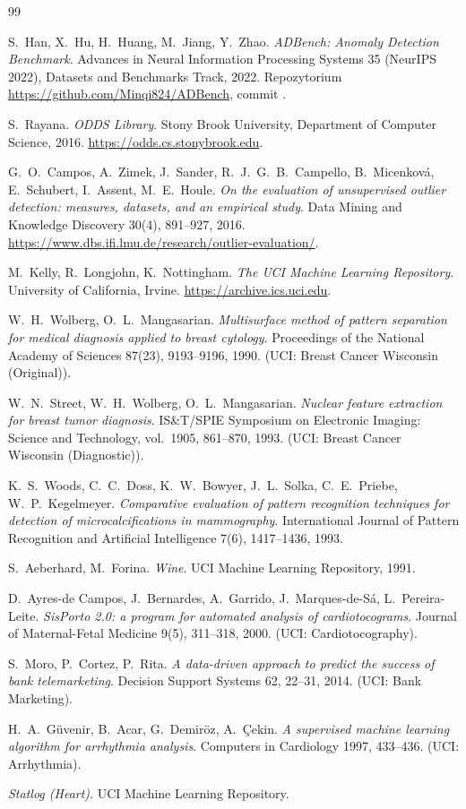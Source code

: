 \begin{thebibliography}{99}
\small

 S.~Han, X.~Hu, H.~Huang, M.~Jiang, Y.~Zhao.
\emph{ADBench: Anomaly Detection Benchmark}. Advances in Neural Information
Processing Systems 35 (NeurIPS 2022), Datasets and Benchmarks Track, 2022.
Repozytorium \url{https://github.com/Minqi824/ADBench},
commit .

 S.~Rayana. \emph{ODDS Library}. Stony Brook University,
Department of Computer Science, 2016. \url{https://odds.cs.stonybrook.edu}.

 G.~O.~Campos, A.~Zimek, J.~Sander, R.~J.~G.~B.~Campello,
B.~Micenková, E.~Schubert, I.~Assent, M.~E.~Houle. \emph{On the evaluation of
unsupervised outlier detection: measures, datasets, and an empirical study}.
Data Mining and Knowledge Discovery 30(4), 891--927, 2016.
\url{https://www.dbs.ifi.lmu.de/research/outlier-evaluation/}.

 M.~Kelly, R.~Longjohn, K.~Nottingham. \emph{The UCI Machine
Learning Repository}. University of California, Irvine.
\url{https://archive.ics.uci.edu}.

 W.~H.~Wolberg, O.~L.~Mangasarian. \emph{Multisurface method
of pattern separation for medical diagnosis applied to breast cytology}.
Proceedings of the National Academy of Sciences 87(23), 9193--9196, 1990.
(UCI: Breast Cancer Wisconsin (Original)).

 W.~N.~Street, W.~H.~Wolberg, O.~L.~Mangasarian. \emph{Nuclear
feature extraction for breast tumor diagnosis}. IS\&T/SPIE Symposium on
Electronic Imaging: Science and Technology, vol.~1905, 861--870, 1993.
(UCI: Breast Cancer Wisconsin (Diagnostic)).

 K.~S.~Woods, C.~C.~Doss, K.~W.~Bowyer, J.~L.~Solka,
C.~E.~Priebe, W.~P.~Kegelmeyer. \emph{Comparative evaluation of pattern
recognition techniques for detection of microcalcifications in mammography}.
International Journal of Pattern Recognition and Artificial Intelligence
7(6), 1417--1436, 1993.

 S.~Aeberhard, M.~Forina. \emph{Wine}. UCI Machine Learning
Repository, 1991.

 D.~Ayres-de Campos, J.~Bernardes, A.~Garrido,
J.~Marques-de-Sá, L.~Pereira-Leite. \emph{SisPorto 2.0: a program for
automated analysis of cardiotocograms}. Journal of Maternal-Fetal Medicine
9(5), 311--318, 2000. (UCI: Cardiotocography).

 S.~Moro, P.~Cortez, P.~Rita. \emph{A data-driven approach
to predict the success of bank telemarketing}. Decision Support Systems 62,
22--31, 2014. (UCI: Bank Marketing).

 H.~A.~Güvenir, B.~Acar, G.~Demiröz, A.~Çekin.
\emph{A supervised machine learning algorithm for arrhythmia analysis}.
Computers in Cardiology 1997, 433--436. (UCI: Arrhythmia).

 \emph{Statlog (Heart)}. UCI Machine Learning Repository.

\end{thebibliography}
